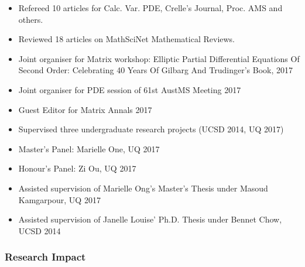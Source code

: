 \documentclass[12pt]{article}
\begin{document}
\begin{itemize}
\item Refereed 10 articles for Calc. Var. PDE, Crelle's Journal, Proc. AMS and others.
\item Reviewed 18 articles on MathSciNet Mathematical Reviews.
\item Joint organiser for Matrix workshop: Elliptic Partial Differential Equations Of Second Order: Celebrating 40 Years Of Gilbarg And Trudinger’s Book, 2017
\item Joint organiser for PDE session of 61st AustMS Meeting 2017
\item Guest Editor for Matrix Annals 2017
\item Supervised three undergraduate research projects (UCSD 2014, UQ 2017)
\item Master's Panel: Marielle One, UQ 2017
\item Honour's Panel: Zi Ou, UQ 2017
\item Assisted supervision of Marielle Ong's Master's Thesis under Masoud Kamgarpour, UQ 2017
\item Assisted supervision of Janelle Louise' Ph.D. Thesis under Bennet Chow, UCSD 2014
\end{itemize}

\subsubsection*{Research Impact}
\label{sec:orgd9998fb}
\end{document}
